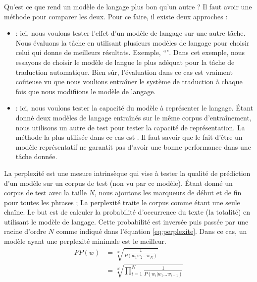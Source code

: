 \documentclass{KodeBook}
\begin{document}
Qu'est ce que rend un modèle de langage plus bon qu'un autre ? 
Il faut avoir une méthode pour comparer les deux. 
Pour ce faire, il existe deux approches : 
	\begin{itemize}
		\item {} : ici, nous voulons tester l'effet d'un modèle de langage sur une autre tâche. 
		Nous évaluons la tâche en utilisant plusieurs modèles de langage pour choisir celui qui donne de meilleurs résultats.
		Exemple, ``". 
		Dans cet exemple, nous essayons de choisir le modèle de langue le plus adéquat pour la tâche de traduction automatique.
		Bien sûr, l'évaluation dans ce cas est vraiment coûteuse vu que nous voulions entraîner le système de traduction à chaque fois que nous modifiions le modèle de langage.
		
		\item {} : ici, nous voulons tester la capacité du modèle à représenter le langage. 
		Étant donné deux modèles de langage entraînés sur le même corpus d'entraînement, nous utilisons un autre de test pour tester la capacité de représentation.
		La méthode la plus utilisée dans ce cas est .
		Il faut savoir que le fait d'être un modèle représentatif ne garantit pas d'avoir une bonne performance dans une tâche donnée.
	\end{itemize}


La perplexité est une mesure intrinsèque qui vise à tester la qualité de prédiction d'un modèle sur un corpus de test (non vu par ce modèle). 
Étant donné un corpus de test avec la taille $N$, nous ajoutons les marqueurs de début et de fin pour toutes les phrases ; La perplexité traite le corpus comme étant une seule chaîne. 
Le but est de calculer la probabilité d'occurrence du texte (la totalité) en utilisant le modèle de langage. 
Cette probabilité est inversée puis passée par une racine d'ordre $N$ comme indiqué dans l'équation \ref{eq:perplexite}.
Dans ce cas, un modèle ayant une perplexité minimale est le meilleur.
%
\begin{align}
	PP(w) & = \sqrt[N]{\frac{1}{P(w_1 w_2 \ldots w_N)}} \nonumber\\
	 & = \sqrt[N]{\prod\limits_{i=1}^{N}\frac{1}{P(w_i | w_1 \ldots w_{i-1})}} \label{eq:perplexite}
\end{align}
\end{document}
